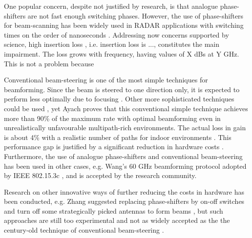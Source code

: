 One popular concern, despite not justified by research, is that analogue phase-shifters are not fast enough switching phases. However, the use of phase-shifters for beam-scanning has been widely used in \ac{RADAR} applications with switching times on the order of nanoseconds \cite{volakis}. Addressing now concerns supported by science, high insertion loss \cite{beam_steering_techniques}, i.e. insertion loss is ..., constitutes the main impairment. The loss grows with frequency, having values of X dBs at Y GHz. This is not a problem because %




Conventional beam-steering is one of the most simple techniques for beamforming. Since the beam is steered to one direction only, it is expected to perform less optimally due to focusing . Other more sophisticated techniques could be used \cite{beam_steering_techniques}, yet Ayach \cite{6292865} proves that this conventional simple technique achieves more than 90\% of the maximum rate with optimal beamforming even in unrealistically unfavourable multipath-rich environments. The actual loss in gain is about 4\% with a realistic number of paths for indoor environments \cite{8891356}. This performance gap is justified by a significant reduction in hardware costs \cite{7010533}. Furthermore, the use of analogue phase-shifters and conventional beam-steering has been used in other cases, e.g. Wang's 60 GHz beamforming protocol adopted by IEEE 802.15.3c \cite{5262295}, and is accepted by the research community.

Research on other innovative ways of further reducing the costs in hardware has been conducted, e.g. Zhang suggested replacing phase-shifters by on-off switches and turn off some strategically picked antennas to form beams \cite{8246591}, but such approaches are still too experimental and not as widely accepted as the the century-old technique of conventional beam-steering \cite{6591907}.







